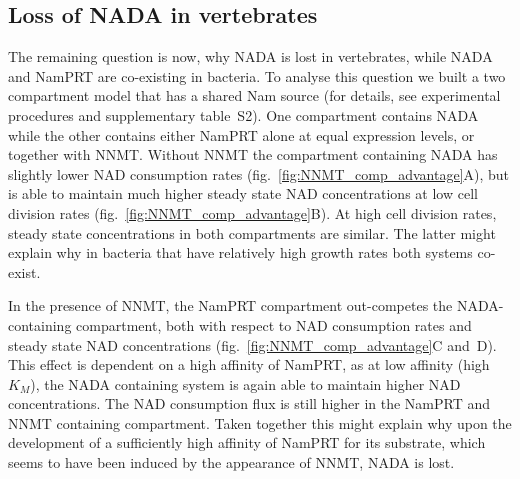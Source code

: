 \subsection{Loss of NADA in vertebrates}

The remaining question is now, why NADA is lost in vertebrates, while NADA and NamPRT are co-existing in bacteria. To analyse this question we built a two compartment model that has a shared Nam source (for details, see experimental procedures and supplementary table~S2). One compartment contains NADA while the other contains either NamPRT alone at equal expression levels, or together with NNMT. Without NNMT the compartment containing NADA has slightly lower NAD consumption rates (fig.~\ref{fig:NNMT_comp_advantage}A), but is able to maintain much higher steady state NAD concentrations at low cell division rates (fig.~\ref{fig:NNMT_comp_advantage}B). At high cell division rates, steady state concentrations in both compartments are similar. The latter might explain why in bacteria that have relatively high growth rates both systems co-exist.

In the presence of NNMT, the NamPRT compartment out-competes the NADA-containing compartment, both with respect to NAD consumption rates and steady state NAD concentrations (fig.~\ref{fig:NNMT_comp_advantage}C and~D). This effect is dependent on a high affinity of NamPRT, as at low affinity (high $K_{M}$), the NADA containing system is again able to maintain higher NAD concentrations. The NAD consumption flux is still higher in the NamPRT and NNMT containing compartment. Taken together this might explain why upon the development of a sufficiently high affinity of NamPRT for its substrate, which seems to have been induced by the appearance of NNMT, NADA is lost.
